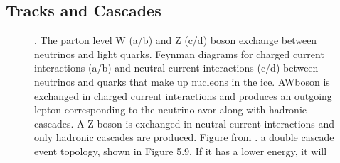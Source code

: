 \subsection{Tracks and Cascades}

\begin{figure}
    \caption{. The parton level W (a/b) and Z (c/d) boson exchange between neutrinos and light quarks. Feynman diagrams for charged current interactions (a/b) and neutral current interactions (c/d) between neutrinos and quarks that make up nucleons in the ice. AWboson is exchanged in charged current interactions and produces an outgoing lepton corresponding to the neutrino avor along with hadronic cascades. A Z boson is exchanged in neutral current interactions and only hadronic cascades are produced. Figure from \cite{physics_withIC3}. a double cascade event topology, shown in Figure 5.9. If it has a lower energy, it will}
    \label{fig:ic2_ccORnc}
\end{figure}

